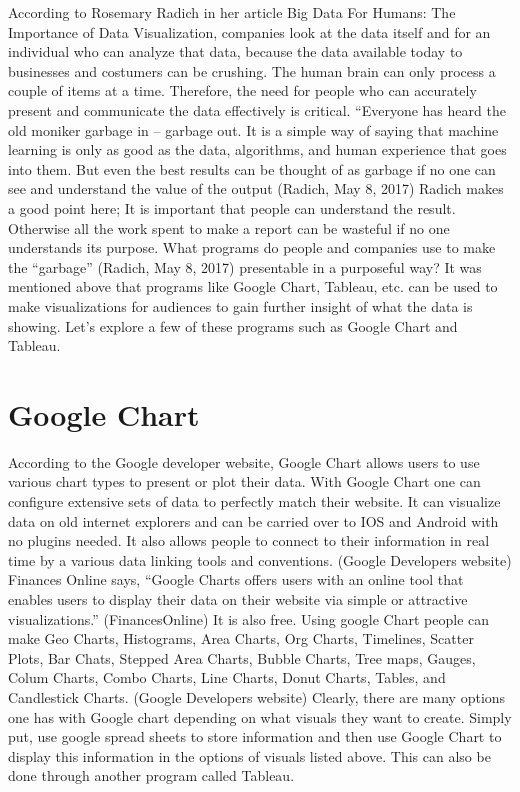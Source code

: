 \documentclass[sigconf]{acmart}
\begin{document}
According to Rosemary Radich in her article Big Data For Humans: The Importance of Data Visualization, companies look at the data itself and for an individual who can analyze that data, because the data available today to businesses and costumers can be crushing. The human brain can only process a couple of items at a time. Therefore, the need for people who can accurately present and communicate the data effectively is critical. “Everyone has heard the old moniker garbage in – garbage out. It is a simple way of saying that machine learning is only as good as the data, algorithms, and human experience that goes into them. But even the best results can be thought of as garbage if no one can see and understand the value of the output (Radich, May 8, 2017) Radich makes a good point here; It is important that people can understand the result. Otherwise all the work spent to make a report can be wasteful if no one understands its purpose. 
What programs do people and companies use to make the “garbage” (Radich, May 8, 2017) presentable in a purposeful way? It was mentioned above that programs like Google Chart, Tableau, etc. can be used to make visualizations for audiences to gain further insight of what the data is showing. Let’s explore a few of these programs such as Google Chart and Tableau. 

\section{Google Chart}
According to the Google developer website, Google Chart allows users to use various chart types to present or plot their data. With Google Chart one can configure extensive sets of data to perfectly match their website. It can visualize data on old internet explorers and can be carried over to IOS and Android with no plugins needed. It also allows people to connect to their information in real time by a various data linking tools and conventions. (Google Developers website) Finances Online says, “Google Charts offers users with an online tool that enables users to display their data on their website via simple or attractive visualizations.” (FinancesOnline) It is also free. Using google Chart people can make Geo Charts, Histograms, Area Charts, Org Charts, Timelines, Scatter Plots, Bar Chats, Stepped Area Charts, Bubble Charts, Tree maps, Gauges, Colum Charts, Combo Charts, Line Charts, Donut Charts, Tables, and Candlestick Charts. (Google Developers website) Clearly, there are many options one has with Google chart depending on what visuals they want to create. Simply put, use google spread sheets to store information and then use Google Chart to display this information in the options of visuals listed above. This can also be done through another program called Tableau. 
\end{document}
